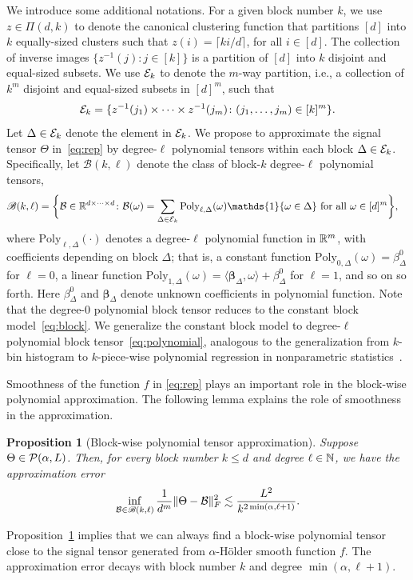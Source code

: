 \documentclass[12pt]{article}
\newtheorem{prop}{Proposition}
\theoremstyle{definition}
\def\caliB{\mathscr{B}}
\begin{document}
We introduce some additional notations. For a given block number $k$, we use $z\in\Pi(d,k)$ to denote the canonical clustering function that partitions $[d]$ into $k$ equally-sized clusters such that 
$z(i) = \lceil ki/d\rceil$, for all $i\in[d]$.
The collection of inverse images $\{z^{-1}(j)\colon j\in[k]\}$ is a partition of $[d]$ into $k$ disjoint and equal-sized subsets. We use $\mathcal{E}_k$ to denote the $m$-way partition, i.e., a collection of $k^m$ disjoint and equal-sized subsets in $[d]^m$, such that 
\begin{align}\label{eq:blockind}
    \mathcal{E}_k = \{z^{-1}(j_1)\times\cdots\times z^{-1}(j_m)\colon (j_1,\ldots,j_m)\in [k]^m\}.
\end{align}
Let $\Delta\in \mathcal{E}_k$ denote the element in $\mathcal{E}_k$. We propose to approximate the signal tensor $\Theta$ in~\eqref{eq:rep} by degree-$\ell$ polynomial tensors within each block $\Delta\in \mathcal{E}_k$. Specifically, let $\caliB(k,\ell)$ denote the class of block-$k$ degree-$\ell$ polynomial tensors,
\begin{align}\label{eq:polynomial}
    \caliB(k,\ell) = \bigg\{&\tB\in \bbR^{d\times \cdots \times d}\colon \tB(\omega) = \sum_{\Delta\in\tE_k}\text{Poly}_{\ell,\Delta}(\omega)\mathds{1}\{\omega\in\Delta\}\text{ for all } \omega\in[d]^m\bigg\},
\end{align}
where $\text{Poly}_{\ell,\Delta}(\cdot)$ denotes a degree-$\ell$ polynomial function in $\mathbb{R}^m$, with coefficients depending on block $\Delta$; that is, a constant function $\text{Poly}_{0,\Delta}(\omega)= \beta^0_{\Delta}$ for $\ell=0$, a linear function $\text{Poly}_{1,\Delta}(\omega)=\langle \boldsymbol{\beta}_{\Delta},\omega\rangle+\beta_{\Delta}^0$ for $\ell=1$, and so on so forth. Here $\beta^0_{\Delta}$ and $\boldsymbol{\beta}_{\Delta}$ denote unknown coefficients in polynomial function. Note that the degree-0 polynomial block tensor reduces to the constant block model~\eqref{eq:block}. We generalize the constant block model to degree-$\ell$ polynomial block tensor~\eqref{eq:polynomial},  analogous to the generalization from $k$-bin histogram to $k$-piece-wise polynomial regression in nonparametric statistics~\citep{wasserman2006all}.

Smoothness of the function $f$ in \eqref{eq:rep} plays an important role in the block-wise polynomial approximation. The following lemma explains the role of smoothness in the approximation. 

\begin{prop}[Block-wise polynomial tensor approximation]\label{lem:approx}
Suppose $\Theta\in\mathcal{P}(\alpha,L)$. Then, for every block number $k\leq d$ and degree $\ell\in \mathbb{N}$, we have the approximation error
\begin{align}
   \inf_{\tB\in\caliB(k,\ell)} \frac{1}{d^m}\FnormSize{}{\Theta-\tB}^2\lesssim \frac{L^2}{k^{2\min(\alpha,\ell+1)}}.
\end{align}
\end{prop}
Proposition~\ref{lem:approx} implies that we can always find a block-wise polynomial tensor close to the signal tensor generated from $\alpha$-H\"older smooth function $f$. The approximation error decays with block number $k$ and degree $\min(\alpha, \ell +1)$.
\end{document}
